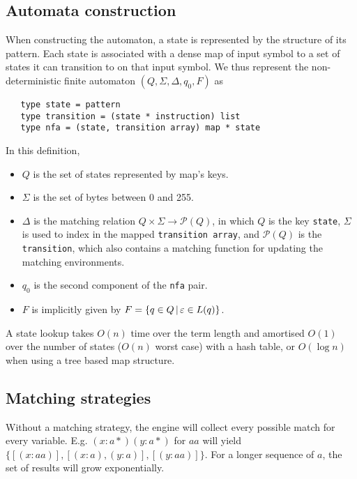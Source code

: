 \subsection{Automata construction}

When constructing the automaton, a state is represented by the structure of its
pattern. Each state is associated with a dense map of input symbol to a set of
states it can transition to on that input symbol. We thus represent the
non-deterministic finite automaton $(Q, \Sigma, \Delta, q_0, F)$ as

\begin{lstlisting}
   type state = pattern
   type transition = (state * instruction) list
   type nfa = (state, transition array) map * state
\end{lstlisting}

In this definition,

\begin{itemize}
   \item $Q$ is the set of states represented by map's keys.
   \item $\Sigma$ is the set of bytes between 0 and 255.
   \item $\Delta$ is the matching relation $Q \times \Sigma \to \mathcal{P}(Q)$,
      in which $Q$ is the key \texttt{state}, $\Sigma$ is used to index in the
      mapped \texttt{transition array}, and $\mathcal{P}(Q)$ is the
      \texttt{transition}, which also contains a matching function for updating
      the matching environments.
   \item $q_0$ is the second component of the \texttt{nfa} pair.
   \item $F$ is implicitly given by $F = \{ q \in Q \operatorname{|} \varepsilon \in L(q) \}$.
\end{itemize}

A state lookup takes $O(n)$ time over the term length and amortised $O(1)$ over
the number of states ($O(n)$ worst case) with a hash table, or $O(\log n)$ when
using a tree based map structure.


\subsection{Matching strategies}

Without a matching strategy, the engine will collect every possible match for
every variable. E.g. $(x:a*)(y:a*)$ for $aa$ will yield $\{[(x:aa)], [(x:a),
(y:a)], [(y:aa)]\}$. For a longer sequence of $a$, the set of results will grow
exponentially.


